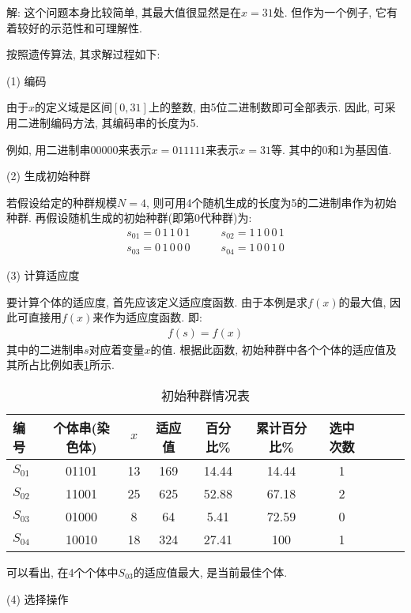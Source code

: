 解: 这个问题本身比较简单, 其最大值很显然是在$x=31$处. 但作为一个例子, 它有着较好的示范性和可理解性.

按照遗传算法, 其求解过程如下:

    (1) 编码

    由于$x$的定义域是区间$[0,31]$上的整数, 由5位二进制数即可全部表示. 因此, 可采用二进制编码方法, 其编码串的长度为5.

    例如, 用二进制串00000来表示$x=011111$来表示$x=31$等. 其中的0和1为基因值.

    (2) 生成初始种群

    若假设给定的种群规模$N=4$, 则可用4个随机生成的长度为5的二进制串作为初始种群. 再假设随机生成的初始种群(即第0代种群)为:
\begin{align*}
  s_{01}=0\,  1\,  1\,  0\,  1 \qquad    & s_{02}=1\,  1\,  0\,  0\,  1\\
  s_{03}=0\,  1\,  0\,  0\,  0 \qquad    &  s_{04}=1\,  0\,  0\,  1\,  0
\end{align*}

 (3) 计算适应度

要计算个体的适应度, 首先应该定义适应度函数. 由于本例是求$f(x)$的最大值, 因此可直接用$f(x)$来作为适应度函数. 即:
\begin{align}
  f(s)=f(x)
\end{align}
其中的二进制串$s$对应着变量$x$的值. 根据此函数, 初始种群中各个个体的适应值及其所占比例如表\ref{AI_table2019112802}所示.
\begin{table}[H]
\caption{初始种群情况表}
\begin{center}
\begin{tabular} {lccccccccc}
  \hline
编号&个体串(染色体)&	$x$	&适应值&	百分比\%&	累计百分比\%&	选中次数\\
\hline
$S_{01}$&     01101&	13&	169&	14.44&	14.44&	1\\
$S_{02}$&	11001&	25&	625&	52.88&	67.18&	2\\
$S_{03}$&	01000&	8&	64&	5.41&	72.59&	0\\
$S_{04}$&	10010&	18&	324&	27.41&	100&	1\\
\hline
\end{tabular}
\end{center}
\label{AI_table2019112802}
\end{table}
可以看出, 在4个个体中$S_{03}$的适应值最大, 是当前最佳个体.

(4) 选择操作

